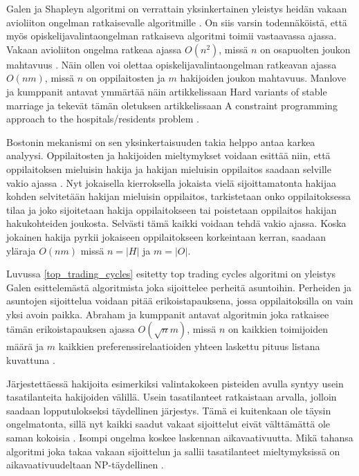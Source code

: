 \documentclass[gradu, twoside]{tktltiki}
\begin{document}
Galen ja Shapleyn algoritmi on verrattain yksinkertainen yleistys
heidän vakaan avioliiton ongelman ratkaisevalle algoritmille
\cite{gusfield89}. On siis varsin todennäköistä, että myös
opiskelijavalintaongelman ratkaiseva algoritmi toimii vastaavassa
ajassa. Vakaan avioliiton ongelma ratkeaa ajassa $O(n^2)$, missä $n$
on osapuolten joukon mahtavuus \cite{gusfield89}. Näin ollen voi
olettaa opiskelijavalintaongelman ratkeavan ajassa $O(nm)$, missä $n$
on oppilaitosten ja $m$ hakijoiden joukon mahtavuus. Manlove ja
kumppanit antavat ymmärtää näin artikkelissaan Hard variants of stable
marriage \cite{manlove02} ja tekevät tämän oletuksen artikkelissaan A
constraint programming approach to the hospitals/residents problem
\cite{manlove07}.

Bostonin mekanismi on sen yksinkertaisuuden takia helppo antaa karkea
analyysi. Oppilaitosten ja hakijoiden mieltymykset voidaan esittää
niin, että oppilaitoksen mieluisin hakija ja hakijan mieluisin
oppilaitos saadaan selville vakio ajassa \cite{gusfield89}. Nyt
jokaisella kierroksella jokaista vielä sijoittamatonta hakijaa kohden
selvitetään hakijan mieluisin oppilaitos, tarkistetaan onko
oppilaitoksessa tilaa ja joko sijoitetaan hakija oppilaitokseen tai
poistetaan oppilaitos hakijan hakukohteiden joukosta. Selvästi tämä
kaikki voidaan tehdä vakio ajassa. Koska jokainen hakija pyrkii
jokaiseen oppilaitokseen korkeintaan kerran, saadaan yläraja $O(nm)$
missä $n = |H|$ ja $m = |O|$.

\enlargethispage{\baselineskip}
Luvussa \ref{top_trading_cycles} esitetty top trading cycles algoritmi
on yleistys Galen esittelemästä algoritmista joka sijoittelee perheitä
asuntoihin. Perheiden ja asuntojen sijoittelua voidaan pitää
erikoistapauksena, jossa oppilaitoksilla on vain yksi avoin paikka.
Abraham ja kumppanit antavat algoritmin joka ratkaisee tämän
erikoistapauksen ajassa $O(\sqrt nm)$, missä $n$ on kaikkien
toimijoiden määrä ja $m$ kaikkien preferenssirelaatioiden yhteen
laskettu pituus listana kuvattuna \cite{abraham05}.

Järjestettäessä hakijoita esimerkiksi valintakokeen pisteiden avulla
syntyy usein tasatilanteita hakijoiden välillä. Usein tasatilanteet
ratkaistaan arvalla, jolloin saadaan lopputulokseksi täydellinen
järjestys. Tämä ei kuitenkaan ole täysin ongelmatonta, sillä nyt
kaikki saadut vakaat sijoittelut eivät välttämättä ole saman kokoisia
\cite{manlove02}. Isompi ongelma koskee laskennan aikavaativuutta.
Mikä tahansa algoritmi joka takaa vakaan sijoittelun ja sallii
tasatilanteet mieltymyksissä on aikavaativuudeltaan NP-täydellinen
\cite{manlove02}.
\end{document}
